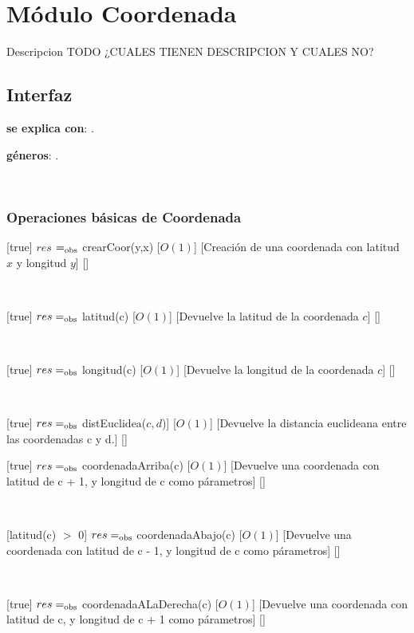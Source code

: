 \section{Módulo Coordenada}

Descripcion TODO ¿CUALES TIENEN DESCRIPCION Y CUALES NO?

\subsection{Interfaz}

\textbf{se explica con}: .

\textbf{géneros}: .

~

\subsubsection{Operaciones básicas de Coordenada}

[true]
{$res$ $=_{\mathrm{obs}}$ crearCoor(y,x)}
[$O(1)$]
[Creación de una coordenada con latitud $x$ y longitud $y$]
[]

~

[true]
{$res =_{\mathrm{obs}}$ latitud(c)}
[$O(1)$]
[Devuelve la latitud de la coordenada $c$]
[]

~

[true]
{$res =_{\mathrm{obs}}$ longitud(c)}
[$O(1)$]
[Devuelve la longitud de la coordenada $c$]
[]

~

[true]
{$res =_{\mathrm{obs}}$ distEuclidea($c, d$)]}
[$O(1)$]
[Devuelve la distancia euclideana entre las coordenadas c y d.]
[]
~

[true]
{$res =_{\mathrm{obs}}$ coordenadaArriba(c)}
[$O(1)$]
[Devuelve una coordenada con latitud de c + 1, y longitud de c como párametros]
[]

~

[latitud(c) $>$ 0]
{$res =_{\mathrm{obs}}$ coordenadaAbajo(c)}
[$O(1)$]
[Devuelve una coordenada con latitud de c - 1, y longitud de c como párametros]
[]

~

[true]
{$res =_{\mathrm{obs}}$ coordenadaALaDerecha(c)}
[$O(1)$]
[Devuelve una coordenada con latitud de c, y longitud de c + 1 como párametros]
[]

